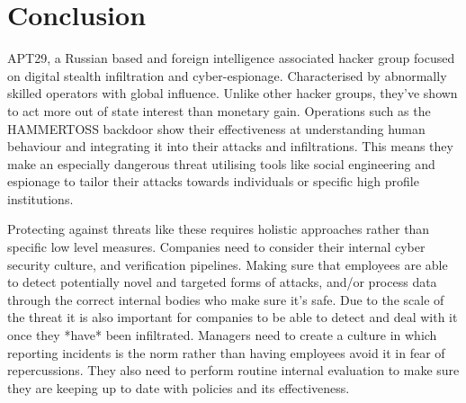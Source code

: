 \section{Conclusion}

APT29, a Russian based and foreign intelligence associated hacker group focused on digital stealth infiltration and cyber-espionage. Characterised by abnormally skilled operators with global influence. Unlike other hacker groups, they've shown to act more out of state interest than monetary gain. Operations such as the HAMMERTOSS backdoor show their effectiveness at understanding human behaviour and integrating it into their attacks and infiltrations. This means they make an especially dangerous threat utilising tools like social engineering and espionage to tailor their attacks towards individuals or specific high profile institutions.

Protecting against threats like these requires holistic approaches rather than specific low level measures. Companies need to consider their internal cyber security culture, and verification pipelines. Making sure that employees are able to detect potentially novel and targeted forms of attacks, and/or process data through the correct internal bodies who make sure it's safe. Due to the scale of the threat it is also important for companies to be able to detect and deal with it once they *have* been infiltrated. Managers need to create a culture in which reporting incidents is the norm rather than having employees avoid it in fear of repercussions. They also need to perform routine internal evaluation to make sure they are keeping up to date with policies and its effectiveness.